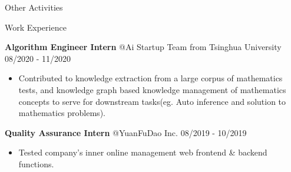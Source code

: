 \documentclass{resume} %
\begin{document}
\begin{CJK}{UTF8}{gbsn}
\begin{rSection}{Other Activities}
\end{rSection}


 


\begin{rSection}{Work Experience}
\vspace{-1.25em}
\item \textbf{Algorithm Engineer Intern} {@Ai Startup Team from Tsinghua University} \hfill 08/2020 - 11/2020

\begin{itemize}
    \item 	Contributed to knowledge extraction from a large corpus of mathematics tests, and knowledge graph based knowledge management of mathematics concepts to serve for downstream tasks(eg. Auto inference and solution to mathematics problems).
\end{itemize}

\item \textbf{Quality Assurance Intern} {@YuanFuDao Inc.} \hfill 08/2019 - 10/2019
\begin{itemize}
    \item 	Tested company's inner online management web frontend \& backend functions.
\end{itemize}
\end{rSection} 



\end{CJK}
\end{document}
